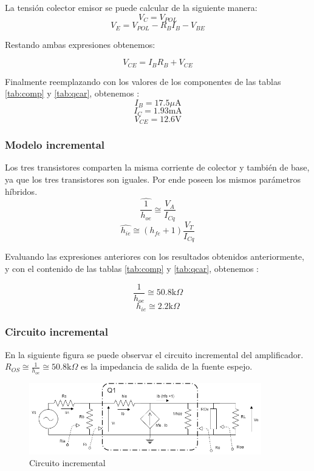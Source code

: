 \documentclass[../../main.tex]{subfiles}
\begin{document}
La tensión colector emisor se puede calcular de la siguiente manera:
\begin{equation}
V_C=V_{POL}
\end{equation}
\begin{equation}
V_E=V_{POL} - R_B I_B - V_{BE}
\end{equation}

Restando ambas expresiones obtenemos:

\begin{equation}
V_{CE}=I_B R_B + V_{CE}
\end{equation}

Finalmente reemplazando con los valores de los componentes de las tablas \ref{tab:comp} y \ref{tab:qcar}, obtenemos :
$$I_B=17.5\mu \mathrm{A} $$
$$I_C=1.93 \mathrm{mA} $$
$$V_{CE}=12.6\mathrm{V} $$

\subsubsection{Modelo incremental}
Los tres transistores comparten la misma corriente de colector y también de base, ya que los tres transistores son iguales. Por ende poseen los  mismos parámetros híbridos.
$$\widehat{\frac{1}{h_{oe}}}\cong \frac{V_A}{I_{Cq}} $$
$$ \widehat{h_{ie}}\cong (h_{fe}+1)\frac{V_T}{I_{Cq}}$$

Evaluando las expresiones anteriores con los resultados obtenidos  anteriormente, y con el contenido de las tablas \ref{tab:comp} y \ref{tab:qcar}, obtenemos :

$$\frac{1}{h_{oe}}\cong 50.8\mathrm{k}\Omega $$
$$ h_{ie}\cong 2.2\mathrm{k}\Omega $$

\subsubsection{Circuito incremental}
En la siguiente figura se puede observar el circuito incremental del amplificador. $R_{OS}\cong \frac{1}{h_{oe}}\cong 50.8\mathrm{k}\Omega  $ es la impedancia de salida de la fuente espejo. 
\begin{figure}[H]	
	\centering
	\includegraphics[width=0.9\textwidth]{imagenes/incr.png}
	\caption{Circuito incremental}
\end{figure}
\end{document}

